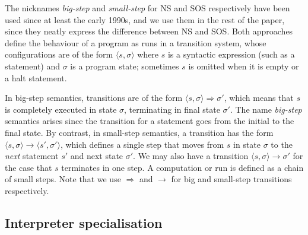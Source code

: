 \documentclass{llncs}
\begin{document}
The nicknames \emph{big-step} and \emph{small-step} for NS and SOS respectively have been used
since at least the early 1990s, and we use them in the rest of the paper, since they neatly
express the difference between NS and SOS.  Both approaches define the behaviour of a program
as runs in a transition system, whose configurations are of the form $\langle s, \sigma\rangle$ where $s$ is a
syntactic expression (such as a statement) and $\sigma$ is a program state; sometimes $s$ is omitted when it is empty
or a halt statement.  

In big-step semantics, transitions are of the form $\langle s, \sigma\rangle \Rightarrow \sigma'$, 
which means that $s$ is completely executed in state $\sigma$, terminating in final state $\sigma'$.
The name \emph{big-step} semantics arises since the transition for a statement goes from the initial to the final state.  
%
By contrast, in small-step semantics, a transition has the form $\langle s, \sigma\rangle \rightarrow \langle s',\sigma'\rangle$, 
which defines a single step
that moves from $s$ in state $\sigma$ to the \emph{next} statement $s'$ and next state $\sigma'$. We may also have a transition
$\langle s, \sigma\rangle \rightarrow \sigma'$ for the case that $s$ terminates in one step.
A computation or run is defined as a 
chain of small steps.  Note that we use $\Rightarrow$ and $\rightarrow$ for big and small-step transitions respectively.

\subsection{Interpreter specialisation}
\end{document}
